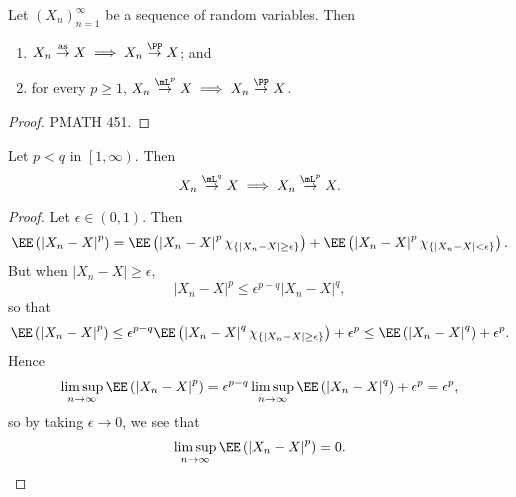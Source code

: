\documentclass[stat901]{subfiles}
\begin{document}
    \begin{prop}{}
        Let $\left( X_{n} \right)^{\infty}_{n=1}$ be a sequence of random variables. Then
        \begin{enumerate}
            \item $X_n\overset{\text{as}}{\to}X \implies X_n\overset{\PP}{\to}X$; and
            \item for every $p\geq 1$, $X_n\overset{\mL^p}{\to}X \implies X_n\overset{\PP}{\to}X$.
        \end{enumerate}
    \end{prop}

    \begin{proof}
        PMATH 451.
    \end{proof}

    \begin{prop}{}
        Let $p<q$ in $\left[ 1,\infty \right)$. Then
        \begin{equation*}
            X_n\overset{\mL^q}{\to}X \implies X_n\overset{\mL^p}{\to}X.
        \end{equation*}
    \end{prop}

    \begin{proof}
        Let $\epsilon\in\left( 0,1 \right)$. Then
        \begin{equation*}
            \EE\left( \left| X_n-X \right|^p \right) = \EE\left( \left| X_n-X \right|^p\chi_{\left\lbrace \left| X_n-X \right|\geq \epsilon \right\rbrace} \right) + \EE\left( \left| X_n-X \right|^p\chi_{\left\lbrace \left| X_n-X \right|<\epsilon \right\rbrace} \right).
        \end{equation*}
        But when $\left| X_n-X \right|\geq\epsilon$,
        \begin{equation*}
            \left| X_n-X \right|^p \leq \epsilon^{p-q} \left| X_n-X \right|^q,
        \end{equation*}
        so that
        \begin{equation*}
            \EE\left( \left| X_n-X \right|^p \right) \leq \epsilon^{p-q} \EE\left( \left| X_n-X \right|^q\chi_{\left\lbrace \left| X_n-X \right|\geq\epsilon \right\rbrace} \right)+\epsilon^p \leq \EE\left( \left| X_n-X \right|^q \right) + \epsilon^p.
        \end{equation*}
        Hence
        \begin{equation*}
            \limsup_{n\to\infty} \EE\left( \left| X_n-X \right|^p \right) = \epsilon^{p-q}\limsup_{n\to\infty}\EE\left( \left| X_n-X \right|^q \right)+\epsilon^p = \epsilon^p,
        \end{equation*}
        so by taking $\epsilon\to 0$, we see that
        \begin{equation*}
            \limsup_{n\to\infty}\EE\left( \left| X_n-X \right|^p \right) = 0.
        \end{equation*}
    \end{proof}
\end{document}
